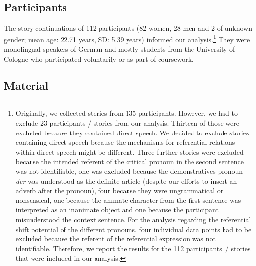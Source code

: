 \documentclass[output=paper,colorlinks,citecolor=brown]{langscibook}
\begin{document}
\subsection{Participants}\label{sec:fuchs:2.1}

The story continuations of 112 participants (82 women, 28 men and 2 of unknown gender; mean age: 22.71 years, SD: 5.39 years) informed our analysis.\footnote{Originally, we collected stories from 135 participants. However, we had to exclude 23 participants / stories from our analysis. Thirteen of those were excluded because they contained direct speech. We decided to exclude stories containing direct speech because the mechanisms for referential relations within direct speech might be different. Three further stories were excluded because the intended referent of the critical pronoun in the second sentence was not identifiable, one was excluded because the demonstratives pronoun \textit{der} was understood as the definite article (despite our efforts to insert an adverb after the pronoun), four because they were ungrammatical or nonsensical, one because the animate character from the first sentence was interpreted as an inanimate object and one because the participant misunderstood the context sentence. For the analysis regarding the referential shift potential of the different pronouns, four individual data points had to be excluded because the referent of the referential expression was not identifiable. Therefore, we report the results for the 112 participants~/ stories that were included in our analysis.} They were monolingual speakers of German and mostly students from the University of Cologne who participated voluntarily or as part of coursework. 

\subsection{Material}\label{sec:fuchs:2.2}
\end{document}
